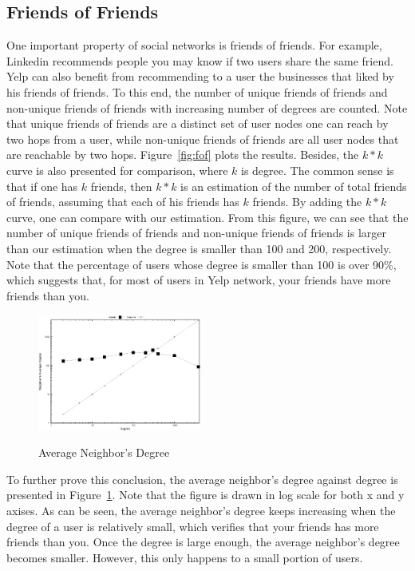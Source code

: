 \documentclass[10pt]{sig-alternate-10pt}   	%
\begin{document}
\subsection{Friends of Friends}
One important property of social networks is friends of friends. For example, Linkedin recommends people you may know
if two users share the same friend. Yelp can also benefit from recommending to a user the businesses 
that liked by his friends of friends. To this end, the number of unique friends of friends and non-unique friends of friends with 
increasing number of degrees are counted. Note that unique friends of friends are a distinct set of user nodes one can 
reach by two hops from a user, while non-unique friends of friends are all user nodes that are reachable by two hops.  
Figure~\ref{fig:fof} plots the results. Besides, the $k*k$ curve is also presented for comparison, where $k$ is degree.  
The common sense is that if one has $k$ friends, then $k*k$ is an estimation of the number of total friends of friends, assuming
that each of his friends has $k$ friends. By adding the $k*k$ curve, one can compare with our estimation. From this 
figure, we can see that the number of unique friends of friends and non-unique friends of friends is larger than our 
estimation when the degree is smaller than 100 and 200, respectively. Note that the percentage of users whose 
degree is smaller than 100 is over 90\%, which suggests that, for most of users in Yelp network, your friends 
have more friends than you. 

\begin{figure}[t]
  \centering
  \caption{Average Neighbor's Degree} 
       \includegraphics[width=0.48\textwidth]{figures/avg.eps}
  \label{fig:avg}
\end{figure} 

To further prove this conclusion, the average neighbor's degree against degree is presented in Figure~\ref{fig:avg}.
Note that the figure is drawn in log scale for both x and y axises. As can be seen, the average neighbor's degree 
keeps increasing when the degree of a user is relatively small, which verifies that your friends has more friends than
you. Once the degree is large enough, the average neighbor's degree becomes smaller. However, this only 
happens to a small portion of users. 
\end{document}
